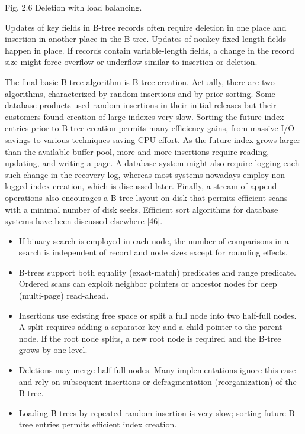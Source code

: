 Fig. 2.6 Deletion with load balancing.

Updates of key fields in B-tree records often require deletion in one
place and insertion in another place in the B-tree. Updates of nonkey
fixed-length fields happen in place. If records contain variable-length
fields, a change in the record size might force overflow or underflow
similar to insertion or deletion.

The final basic B-tree algorithm is B-tree creation. Actually, there are
two algorithms, characterized by random insertions and by prior sorting.
Some database products used random insertions in their initial releases
but their customers found creation of large indexes very slow. Sorting
the future index entries prior to B-tree creation permits many
efficiency gains, from massive I/O savings to various techniques saving
CPU effort. As the future index grows larger than the available buffer
pool, more and more insertions require reading, updating, and writing a
page. A database system might also require logging each such change in
the recovery log, whereas most systems nowadays employ non-logged index
creation, which is discussed later. Finally, a stream of append
operations also encourages a B-tree layout on disk that permits
efficient scans with a minimal number of disk seeks. Efficient sort
algorithms for database systems have been discussed elsewhere {[}46{]}.

\begin{itemize}
\item
  If binary search is employed in each node, the number of comparisons
  in a search is independent of record and node sizes except for
  rounding effects.
\end{itemize}

\begin{itemize}
\item
  B-trees support both equality (exact-match) predicates and range
  predicate. Ordered scans can exploit neighbor pointers or ancestor
  nodes for deep (multi-page) read-ahead.
\item
  Insertions use existing free space or split a full node into two
  half-full nodes. A split requires adding a separator key and a child
  pointer to the parent node. If the root node splits, a new root node
  is required and the B-tree grows by one level.
\item
  Deletions may merge half-full nodes. Many implementations ignore this
  case and rely on subsequent insertions or defragmentation
  (reorganization) of the B-tree.
\item
  Loading B-trees by repeated random insertion is very slow; sorting
  future B-tree entries permits efficient index creation.
\end{itemize}

